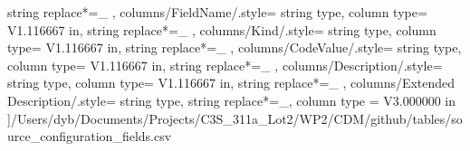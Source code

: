 \begin{landscape}
{            string replace*={_}{}
        },
    columns/FieldName/.style={
            string type, 
            column type= V{1.116667 in}, 
            string replace*={_}{}
        },
    columns/Kind/.style={
            string type, 
            column type= V{1.116667 in}, 
            string replace*={_}{}
        },
    columns/CodeValue/.style={
            string type, 
            column type= V{1.116667 in}, 
            string replace*={_}{}
        },
    columns/Description/.style={
            string type, 
            column type= V{1.116667 in}, 
            string replace*={_}{}
        },
    columns/Extended Description/.style={
            string type, 
            string replace*={_}{},
            column type = V{3.000000 in}
        }
    ]{/Users/dyb/Documents/Projects/C3S_311a_Lot2/WP2/CDM/github/tables/source_configuration_fields.csv}
\end{landscape}
